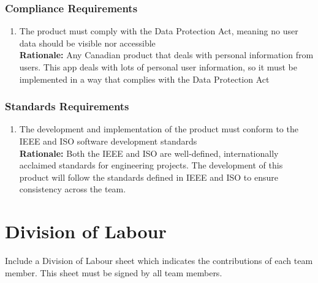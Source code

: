 \documentclass[]{article}
\begin{document}
\subsubsection{Compliance Requirements}
\label{ssub:compliance_requirements}
\begin{enumerate}[{LR-COMP}1. ]
	\item The product must comply with the Data Protection Act, meaning no user data should be visible nor accessible \\
	{\bf Rationale:} Any Canadian product that deals with personal information from users. This app deals with lots of personal user information, so it must be implemented in a way that complies with the Data Protection Act
\end{enumerate}

\subsubsection{Standards Requirements}
\label{ssub:standards_requirements}
\begin{enumerate}[{LR-STD}1. ]
	\item The development and implementation of the product must conform to the IEEE and ISO software development standards \\
	{\bf Rationale:} Both the IEEE and ISO are well-defined, internationally acclaimed standards for engineering projects. The development of this product will follow the standards defined in IEEE and ISO to ensure consistency across the team.
\end{enumerate}



\appendix
\section{Division of Labour}
\label{sec:division_of_labour}
Include a Division of Labour sheet which indicates the contributions of each team member. This sheet must be signed by all team members.
\end{document}

